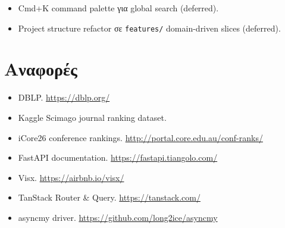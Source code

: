 \begin{itemize}
    \item Cmd+K command palette για global search (deferred).
    \item Project structure refactor σε
          \texttt{features/} domain-driven slices (deferred).
\end{itemize}

\section{Αναφορές}

\begin{itemize}
    \item DBLP. \url{https://dblp.org/}
    \item Kaggle Scimago journal ranking dataset.
    \item iCore26 conference rankings. \url{http://portal.core.edu.au/conf-ranks/}
    \item FastAPI documentation. \url{https://fastapi.tiangolo.com/}
    \item Visx. \url{https://airbnb.io/visx/}
    \item TanStack Router \& Query. \url{https://tanstack.com/}
    \item asyncmy driver. \url{https://github.com/long2ice/asyncmy}
\end{itemize}
